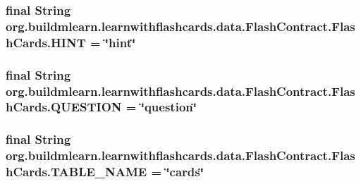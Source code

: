 \subsubsection[{\texorpdfstring{H\+I\+NT}{HINT}}]{\setlength{\rightskip}{0pt plus 5cm}final String org.\+buildmlearn.\+learnwithflashcards.\+data.\+Flash\+Contract.\+Flash\+Cards.\+H\+I\+NT = \char`\"{}hint\char`\"{}\hspace{0.3cm}{\ttfamily [static]}}\hypertarget{classorg_1_1buildmlearn_1_1learnwithflashcards_1_1data_1_1FlashContract_1_1FlashCards_a2c347ee6d0085d7eb67f6d3da8f98d1f}{}\label{classorg_1_1buildmlearn_1_1learnwithflashcards_1_1data_1_1FlashContract_1_1FlashCards_a2c347ee6d0085d7eb67f6d3da8f98d1f}
\subsubsection[{\texorpdfstring{Q\+U\+E\+S\+T\+I\+ON}{QUESTION}}]{\setlength{\rightskip}{0pt plus 5cm}final String org.\+buildmlearn.\+learnwithflashcards.\+data.\+Flash\+Contract.\+Flash\+Cards.\+Q\+U\+E\+S\+T\+I\+ON = \char`\"{}question\char`\"{}\hspace{0.3cm}{\ttfamily [static]}}\hypertarget{classorg_1_1buildmlearn_1_1learnwithflashcards_1_1data_1_1FlashContract_1_1FlashCards_abe5a359cab3c3b1a89604497e645b1df}{}\label{classorg_1_1buildmlearn_1_1learnwithflashcards_1_1data_1_1FlashContract_1_1FlashCards_abe5a359cab3c3b1a89604497e645b1df}
\subsubsection[{\texorpdfstring{T\+A\+B\+L\+E\+\_\+\+N\+A\+ME}{TABLE_NAME}}]{\setlength{\rightskip}{0pt plus 5cm}final String org.\+buildmlearn.\+learnwithflashcards.\+data.\+Flash\+Contract.\+Flash\+Cards.\+T\+A\+B\+L\+E\+\_\+\+N\+A\+ME = \char`\"{}cards\char`\"{}\hspace{0.3cm}{\ttfamily [static]}}\hypertarget{classorg_1_1buildmlearn_1_1learnwithflashcards_1_1data_1_1FlashContract_1_1FlashCards_a1df683e63de75b46348ae0f509f7b2eb}{}\label{classorg_1_1buildmlearn_1_1learnwithflashcards_1_1data_1_1FlashContract_1_1FlashCards_a1df683e63de75b46348ae0f509f7b2eb}


